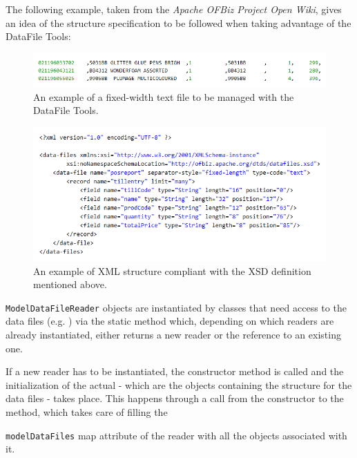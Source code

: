 {The following example, taken from the \textit{Apache OFBiz Project Open Wiki}, gives an idea of the structure specification to be followed when taking advantage of the DataFile Tools:

\begin{figure}[H]
\begin{center}
		\centerline{\includegraphics[width=\textwidth]{./pictures/CSV_text_data_example.PNG}}
		\caption{An example of a fixed-width text file to be managed with the DataFile Tools.}
		\label{text_example}
\end{center}
\end{figure}

\begin{figure}[H]
\begin{center}
		\centerline{\includegraphics[width=\textwidth]{./pictures/XML_structure_example.PNG}}
		\caption{An example of XML structure compliant with the XSD definition mentioned above.}
		\label{text_example}
\end{center}
\end{figure}

\texttt{ModelDataFileReader} objects are instantiated by classes that need access to the data files (e.g. ) via the  static method which, depending on which readers are already instantiated, either returns a new reader or the reference to an existing one.

If a new reader has to be instantiated, the constructor method is called and the initialization of the actual  - which are the objects containing the structure for the data files - takes place. This happens through a call from the constructor to the  method, which takes care of filling the {\texttt{modelDataFiles} map attribute of the reader with all the  objects associated with it.

}}
